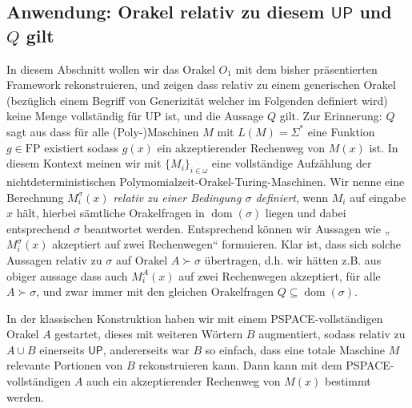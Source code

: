 \documentclass[nofonts]{uebung}
\theoremstyle{definition}
\def\FP{\ensuremath{\mathrm{FP}}}
\def\UP{\ensuremath{\mathrm{UP}}}
\DeclareMathOperator{\dom}{dom}
\def\hUP{\ensuremath{\mathsf{UP}}}
\begin{document}

\subsection{Anwendung: Orakel relativ zu diesem $\hUP$ und $Q$ gilt}

In diesem Abschnitt wollen wir das Orakel $O_1$ mit dem bisher präsentierten Framework rekonstruieren, und zeigen dass relativ zu einem generischen Orakel (bezüglich einem Begriff von Generizität welcher im Folgenden definiert wird) keine Menge vollständig für $\UP$ ist, und die Aussage $Q$ gilt. Zur Erinnerung: $Q$ sagt aus dass für alle (Poly-)Maschinen $M$ mit $L(M)=\Sigma^*$ eine Funktion $g\in\FP$ existiert sodass $g(x)$ ein akzeptierender Rechenweg von $M(x)$ ist.
In diesem Kontext meinen wir mit $\{M_i\}_{i\in\omega}$ eine vollständige Aufzählung der nichtdeterministischen Polymomialzeit-Orakel-Turing-Maschinen.
Wir nenne eine Berechnung $M_i^\sigma(x)$ \emph{relativ zu einer Bedingung $\sigma$ definiert}, wenn $M_i$ auf eingabe $x$ hält, hierbei sämtliche Orakelfragen in $\dom(\sigma)$ liegen und dabei entsprechend $\sigma$ beantwortet werden.
Entsprechend können wir Aussagen wie „$M_i^\sigma(x)$ akzeptiert auf zwei Rechenwegen“ formuieren.
Klar ist, dass sich solche Aussagen relativ zu $\sigma$ auf Orakel $A\succ \sigma$ übertragen, d.h. wir hätten z.B. aus obiger aussage dass auch $M_i^A(x)$ auf zwei Rechenwegen akzeptiert, für alle $A\succ\sigma$, und zwar immer mit den gleichen Orakelfragen $Q\subseteq \dom(\sigma)$.

In der klassischen Konstruktion haben wir mit einem PSPACE-vollständigen Orakel $A$ gestartet, dieses mit weiteren Wörtern $B$ augmentiert, sodass relativ zu $A\cup B$ einerseits $\hUP$, andererseits war $B$ so einfach, dass eine totale Maschine $M$ relevante Portionen von $B$ rekonstruieren kann. Dann kann mit dem PSPACE-vollständigen $A$ auch ein akzeptierender Rechenweg von $M(x)$ bestimmt werden.
\end{document}
